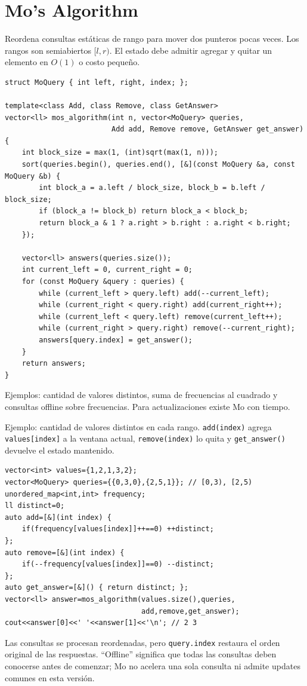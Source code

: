 \section{Mo's Algorithm}

Reordena consultas est\'aticas de rango para mover dos punteros pocas veces.
Los rangos son semiabiertos $[l,r)$. El estado debe admitir agregar y quitar
un elemento en $O(1)$ o costo peque\~no.


\begin{lstlisting}[style=cpp]
struct MoQuery { int left, right, index; };

template<class Add, class Remove, class GetAnswer>
vector<ll> mos_algorithm(int n, vector<MoQuery> queries,
                         Add add, Remove remove, GetAnswer get_answer) {
    int block_size = max(1, (int)sqrt(max(1, n)));
    sort(queries.begin(), queries.end(), [&](const MoQuery &a, const MoQuery &b) {
        int block_a = a.left / block_size, block_b = b.left / block_size;
        if (block_a != block_b) return block_a < block_b;
        return block_a & 1 ? a.right > b.right : a.right < b.right;
    });

    vector<ll> answers(queries.size());
    int current_left = 0, current_right = 0;
    for (const MoQuery &query : queries) {
        while (current_left > query.left) add(--current_left);
        while (current_right < query.right) add(current_right++);
        while (current_left < query.left) remove(current_left++);
        while (current_right > query.right) remove(--current_right);
        answers[query.index] = get_answer();
    }
    return answers;
}
\end{lstlisting}

Ejemplos: cantidad de valores distintos, suma de frecuencias al cuadrado y
consultas offline sobre frecuencias. Para actualizaciones existe Mo con tiempo.

Ejemplo: cantidad de valores distintos en cada rango. \texttt{add(index)} agrega
\texttt{values[index]} a la ventana actual, \texttt{remove(index)} lo quita y
\texttt{get\_answer()} devuelve el estado mantenido.

\begin{lstlisting}[style=cpp]
vector<int> values={1,2,1,3,2};
vector<MoQuery> queries={{0,3,0},{2,5,1}}; // [0,3), [2,5)
unordered_map<int,int> frequency;
ll distinct=0;
auto add=[&](int index) {
    if(frequency[values[index]]++==0) ++distinct;
};
auto remove=[&](int index) {
    if(--frequency[values[index]]==0) --distinct;
};
auto get_answer=[&]() { return distinct; };
vector<ll> answer=mos_algorithm(values.size(),queries,
                                add,remove,get_answer);
cout<<answer[0]<<' '<<answer[1]<<'\n'; // 2 3
\end{lstlisting}

Las consultas se procesan reordenadas, pero \texttt{query.index} restaura el
orden original de las respuestas. ``Offline'' significa que todas las consultas
deben conocerse antes de comenzar; Mo no acelera una sola consulta ni admite
updates comunes en esta versi\'on.
